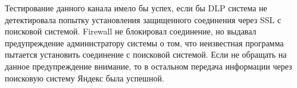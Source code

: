 Тестирование данного канала имело бы успех, если бы DLP система не детектировала попытку установления защищенного соединения через SSL с поисковой системой. Firewall не блокировал соединение, но выдавал предупреждение администратору системы о том, что неизвестная программа пытается установить соединение с поисковой системой. Если не обращать на данное предупреждение внимание, то в остальном передача информации через поисковую систему Яндекс была успешной.